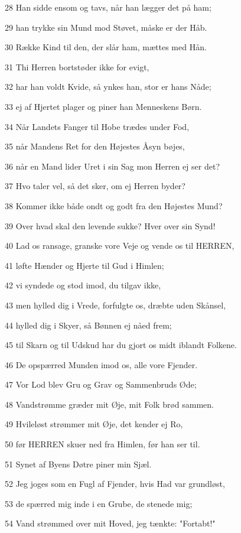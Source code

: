 \par 28 Han sidde ensom og tavs, når han lægger det på ham;
\par 29 han trykke sin Mund mod Støvet, måske er der Håb.
\par 30 Række Kind til den, der slår ham, mættes med Hån.
\par 31 Thi Herren bortstøder ikke for evigt,
\par 32 har han voldt Kvide, så ynkes han, stor er hans Nåde;
\par 33 ej af Hjertet plager og piner han Menneskens Børn.
\par 34 Når Landets Fanger til Hobe trædes under Fod,
\par 35 når Mandens Ret for den Højestes Åsyn bøjes,
\par 36 når en Mand lider Uret i sin Sag mon Herren ej ser det?
\par 37 Hvo taler vel, så det sker, om ej Herren byder?
\par 38 Kommer ikke både ondt og godt fra den Højestes Mund?
\par 39 Over hvad skal den levende sukke? Hver over sin Synd!
\par 40 Lad os ransage, granske vore Veje og vende os til HERREN,
\par 41 løfte Hænder og Hjerte til Gud i Himlen;
\par 42 vi syndede og stod imod, du tilgav ikke,
\par 43 men hylled dig i Vrede, forfulgte os, dræbte uden Skånsel,
\par 44 hylled dig i Skyer, så Bønnen ej nåed frem;
\par 45 til Skarn og til Udskud har du gjort os midt iblandt Folkene.
\par 46 De opspærred Munden imod os, alle vore Fjender.
\par 47 Vor Lod blev Gru og Grav og Sammenbruds Øde;
\par 48 Vandstrømme græder mit Øje, mit Folk brød sammen.
\par 49 Hvileløst strømmer mit Øje, det kender ej Ro,
\par 50 før HERREN skuer ned fra Himlen, før han ser til.
\par 51 Synet af Byens Døtre piner min Sjæl.
\par 52 Jeg joges som en Fugl af Fjender, hvis Had var grundløst,
\par 53 de spærred mig inde i en Grube, de stenede mig;
\par 54 Vand strømmed over mit Hoved, jeg tænkte: "Fortabt!"
